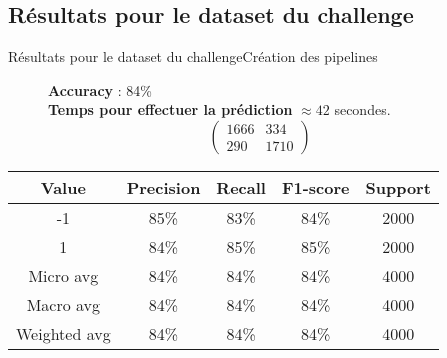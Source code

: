 \documentclass[usenames,dvipsnames]{beamer}
\begin{document}
\subsection{Résultats pour le dataset du challenge}
\begin{frame}{Résultats pour le dataset du challenge}{Création des pipelines}
\begin{figure}[!ht]
  \centering
  \textbf{Accuracy} : 84\% \\
  \textbf{Temps pour effectuer la prédiction} $\approx42$ secondes.
  $$
  \begin{pmatrix}
  1666 & 334 \\
  290 & 1710
  \end{pmatrix}
  $$
\end{figure}

\begin{table}
  \centering
  \begin{tabular}{|c|c|c|c|c|}
    \hline
    \textbf{Value} & \textbf{Precision} & \textbf{Recall} & \textbf{F1-score} & \textbf{Support}\\
    \hline
    \hline
    -1 & 85\% & 83\% & 84\% & 2000\\
    \hline
    1 & 84\% & 85\% & 85\% & 2000\\
    \hline
    Micro avg & 84\% & 84\% & 84\% & 4000\\
    \hline
    Macro avg & 84\% & 84\% & 84\% & 4000\\
    \hline
    Weighted avg & 84\% & 84\% & 84\% & 4000\\
    \hline
  \end{tabular}
\end{table}
\end{frame}
\end{document}
